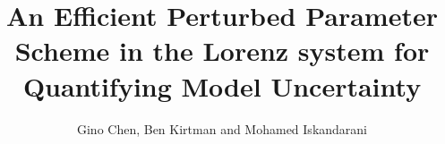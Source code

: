 \documentclass[graphics]{beamer}
\title[Efficient Perturbed Parameter Scheme] {An Efficient Perturbed Parameter Scheme in the Lorenz system for Quantifying Model Uncertainty} %
\author[Gino Chen et al ]{Gino Chen, Ben Kirtman and Mohamed Iskandarani} %
\institute[University of Miami] %
{ University of Miami\\ %
\medskip
\textit{} %
}
\date{} %
\begin{document}
  
\begin{frame}
\titlepage %
\end{frame}




%
\end{document}
